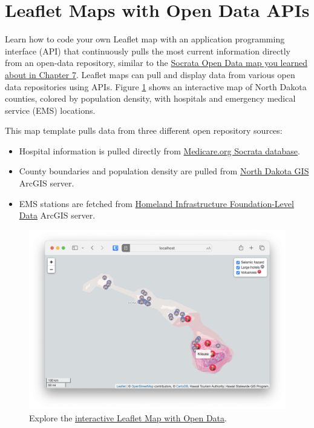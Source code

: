 \documentclass[
  english,
]{book}
\providecommand{\tightlist}{%
  \setlength{\itemsep}{0pt}\setlength{\parskip}{0pt}}
\begin{document}
\hypertarget{leaflet-maps-open-data-apis}{%
\section*{Leaflet Maps with Open Data APIs}\label{leaflet-maps-open-data-apis}}

Learn how to code your own Leaflet map with an application programming interface (API) that continuously pulls the most current information directly from an open-data repository, similar to the \href{map-socrata.html}{Socrata Open Data map you learned about in Chapter 7}. Leaflet maps can pull and display data from various open data repositories using APIs.
Figure \ref{fig:leaflet-open-data} shows an interactive map of North Dakota counties,
colored by population density, with hospitals and emergency medical service (EMS) locations.

This map template pulls data from three different open repository sources:

\begin{itemize}
\tightlist
\item
  Hospital information is pulled directly from \href{https://data.medicare.gov/}{Medicare.org Socrata database}.
\item
  County boundaries and population density are pulled from \href{https://www.gis.nd.gov/}{North Dakota GIS} ArcGIS server.
\item
  EMS stations are fetched from \href{https://hifld-geoplatform.opendata.arcgis.com/}{Homeland Infrastructure Foundation-Level Data} ArcGIS server.
\end{itemize}



\begin{figure}
\centering
\includegraphics{images/12-leaflet/leaflet-open-data.png}
\caption{\label{fig:leaflet-open-data}Explore the \href{https://handsondataviz.github.io/leaflet-maps-open-data-apis/index.html}{interactive Leaflet Map with Open Data}.}
\end{figure}
\end{document}
